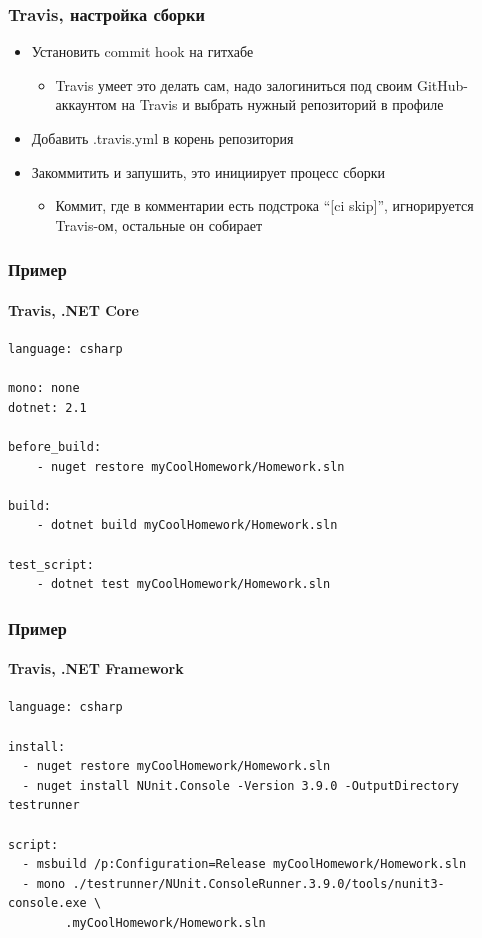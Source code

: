 \documentclass[xetex,mathserif,serif]{beamer}
\begin{document}
	\begin{frame}
		\frametitle{Travis, настройка сборки}
		\begin{itemize}
			\item Установить commit hook на гитхабе
			\begin{itemize}
				\item Travis умеет это делать сам, надо залогиниться под своим GitHub-аккаунтом на Travis и выбрать нужный репозиторий в профиле
			\end{itemize}
			\item Добавить .travis.yml в корень репозитория
			\item Закоммитить и запушить, это инициирует процесс сборки
			\begin{itemize}
				\item Коммит, где в комментарии есть подстрока ``[ci skip]'', игнорируется Travis-ом, остальные он собирает
			\end{itemize}
		\end{itemize}
	\end{frame}

	\begin{frame}[fragile]
		\frametitle{Пример}
		\framesubtitle{Travis, .NET Core}
		\begin{verbatim}
language: csharp

mono: none
dotnet: 2.1

before_build: 
    - nuget restore myCoolHomework/Homework.sln

build: 
    - dotnet build myCoolHomework/Homework.sln

test_script: 
    - dotnet test myCoolHomework/Homework.sln
		\end{verbatim}
	\end{frame}

	\begin{frame}[fragile]
		\frametitle{Пример}
		\framesubtitle{Travis, .NET Framework}
		\begin{small}
			\begin{verbatim}
language: csharp

install:
  - nuget restore myCoolHomework/Homework.sln
  - nuget install NUnit.Console -Version 3.9.0 -OutputDirectory testrunner

script:
  - msbuild /p:Configuration=Release myCoolHomework/Homework.sln
  - mono ./testrunner/NUnit.ConsoleRunner.3.9.0/tools/nunit3-console.exe \
        .myCoolHomework/Homework.sln
			\end{verbatim}
		\end{small}
	\end{frame}
\end{document}
